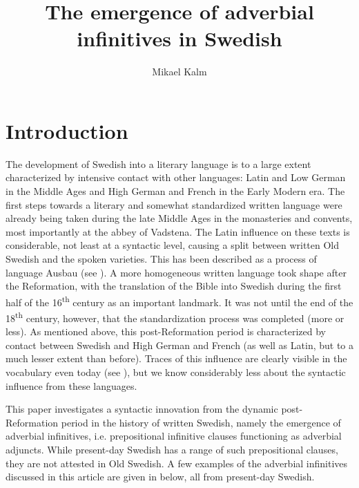 \documentclass[output=paper]{langscibook}
\author{Mikael Kalm\affiliation{Stockholm University}}
\title{The emergence of adverbial infinitives in Swedish}
\begin{document}
\maketitle 



\section{Introduction}\label{sec:kalm:1}\largerpage
The development of Swedish into a literary language is to a large extent characterized by intensive contact with other languages: Latin and Low German in the Middle Ages and High German and French in the Early Modern era. The first steps towards a literary and somewhat standardized written language were already being taken during the late Middle Ages in the monasteries and convents, most importantly at the abbey of Vadstena. The Latin influence on these texts is considerable, not least at a syntactic level, causing a split between written Old Swedish and the spoken varieties. This has been described as a process of language Ausbau (see \citealt{Hoder2009, Hoder2010}). A more homogeneous written language took shape after the Reformation, with the translation of the Bible into Swedish during the first half of the 16\textsuperscript{th} century as an important landmark. It was not until the end of the 18\textsuperscript{th} century, however, that the standardization process was completed (more or less). As mentioned above, this post-Reformation period is characterized by contact between Swedish and High German and French (as well as Latin, but to a much lesser extent than before). Traces of this influence are clearly visible in the vocabulary even today (see \citealt{Teleman2003Swedish,Teleman2003Tradis}), but we know considerably less about the syntactic influence from these languages. 



This paper investigates a syntactic innovation from the dynamic post-Ref\-or\-ma\-tion period in the history of written Swedish, namely the emergence of adverbial infinitives, i.e. prepositional infinitive clauses functioning as adverbial adjuncts. While present-day Swedish has a range of such prepositional clauses, they are not attested in Old Swedish. A few examples of the adverbial infinitives discussed in this article are given in  below, all from present-day Swedish.\largerpage  
\end{document}
